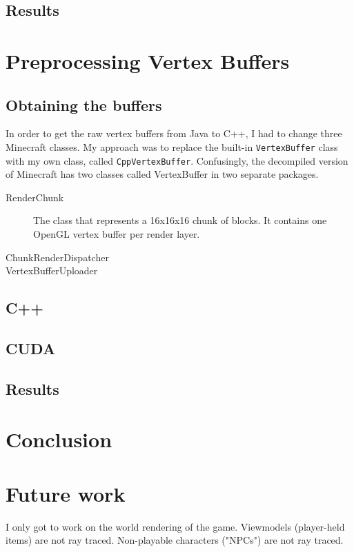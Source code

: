 \documentclass[]{article}
\begin{document}
\subsection{Results}


\section{Preprocessing Vertex Buffers}

\subsection{Obtaining the buffers}
In order to get the raw vertex buffers from Java to C++, I had to change three Minecraft classes.
My approach was to replace the built-in \texttt{VertexBuffer} class with my own class, called \texttt{CppVertexBuffer}.
Confusingly, the decompiled version of Minecraft has two classes called VertexBuffer in two separate packages.


\begin{description}
  \item[RenderChunk]
    The class that represents a 16x16x16 chunk of blocks.
    It contains one OpenGL vertex buffer per render layer.
  \item[ChunkRenderDispatcher]
  \item[VertexBufferUploader]
\end{description}

\subsection{C++}

\subsection{CUDA}

\subsection{Results}

\section{Conclusion}

\section{Future work}
I only got to work on the world rendering of the game.
Viewmodels (player-held items) are not ray traced.
Non-playable characters ("NPCs") are not ray traced.
\end{document}
